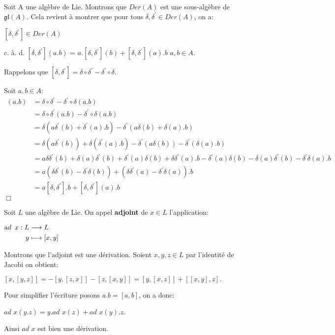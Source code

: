 \documentclass[a4paper,openany,12pt]{report}
\newcommand{\gl}{\mathfrak{gl}}
\theoremstyle{break}
{\theorembodyfont{\upshape}
\newtheorem*{rmq}{Remarque :}
\newtheorem*{prv}{Preuve :}
\newtheorem*{ex}{Exemples :}
\newtheorem*{exe}{Exemple : }
\newtheorem*{nota}{Notation :}
\newtheorem*{dem}{D\'emonstration :}}
\begin{document}
\begin{prv}
Soit A une algèbre de Lie. Montrons que $Der(A)$ est une sous-algèbre de $\gl(A)$. Cela revient à montrer que pour tous $\delta ,\delta^{\prime} \in Der(A)$, on a:
\begin{center}
$[\delta,\delta^{\prime}] \in Der(A)$

c. à. d. \quad $[\delta,\delta^{\prime}](a.b)$ = $a.[\delta,\delta^{\prime}](b)+[\delta,\delta^{\prime}](a).b$ \quad $a,b\in A$.
\end{center}


Rappelons que $[\delta,\delta^{\prime}]=\delta\circ\delta^{\prime}-\delta^{\prime}\circ\delta$.

Soit $a,b\in A$:
\begin{align*}
[\delta,\delta^{\prime}](a.b) & = \delta\circ\delta^{\prime}-\delta^{\prime}\circ\delta(a.b) \\
& = \delta\circ\delta^{\prime}(a.b)-\delta^{\prime}\circ\delta(a.b)\\
& = \delta(a\delta^{\prime}(b)+\delta^{\prime}(a).b)-\delta^{\prime}(a\delta(b)+\delta(a).b)\\
& = \delta(a\delta^{\prime}(b))+\delta (\delta^{\prime}(a).b)-\delta^{\prime}(a\delta(b))-\delta^{\prime}(\delta(a).b)\\
& = a\delta\delta^{\prime}(b)+\delta(a)\delta^{\prime}(b)+\delta^{\prime}(a)\delta(b)+\delta\delta^{\prime}(a).b-\delta^{\prime}(a)\delta(b)-\delta(a)\delta^{\prime}(b)-\delta^{\prime}\delta(a).b \\
& = a(\delta\delta^{\prime}(b)-\delta^{\prime}\delta(b))+(\delta\delta^{\prime}(a)-\delta^{\prime}\delta(a)).b \\
& = a[\delta,\delta^{\prime}].b+[\delta,\delta^{\prime}](a).b\
\end{align*}
 $\Box$
\end{prv}

\begin{exe}
\quad Soit $L$ une algèbre de Lie. On appel \textbf{adjoint} de $x \in L$ l'application:
\begin{center}
$\begin{aligned} \text  ad \enskip x : L & \longrightarrow L \\ y & \longmapsto[x, y] \end{aligned}$
\end{center}

Montrons que l'adjoint est une dérivation. Soient $x,y,z \in L$ par l'identité de Jacobi on obtient:
\begin{center}
$[x,[y,z]]=-[y,[z,x]]-[z,[x,y]]=[y,[x,z]]+[[x,y],z].$
\end{center}
Pour simplifier l'écriture posons $a.b=[a,b]$, on a donc: 
\begin{center}
$ad$ $x(y.z)=y.ad$ $x(z)+ad$ $x(y).z$.
\end{center} 
Ainsi $ad$ $x$ est bien une dérivation.
\end{exe}
\end{document}
